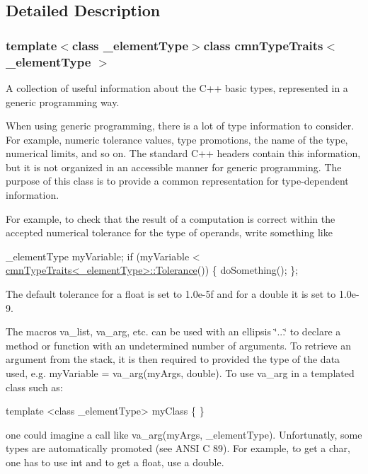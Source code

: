 \subsection{Detailed Description}
\subsubsection*{template$<$class \+\_\+element\+Type$>$class cmn\+Type\+Traits$<$ \+\_\+element\+Type $>$}

A collection of useful information about the C++ basic types, represented in a generic programming way. 

When using generic programming, there is a lot of type information to consider. For example, numeric tolerance values, type promotions, the name of the type, numerical limits, and so on. The standard C++ headers contain this information, but it is not organized in an accessible manner for generic programming. The purpose of this class is to provide a common representation for type-\/dependent information.

For example, to check that the result of a computation is correct within the accepted numerical tolerance for the type of operands, write something like 
\begin{DoxyCode}
\_elementType myVariable;
\textcolor{keywordflow}{if} (myVariable < \hyperlink{classcmn_type_traits}{cmnTypeTraits<\_elementType>::Tolerance}()) \{
    doSomething();
\};
\end{DoxyCode}


The default tolerance for a float is set to 1.\+0e-\/5f and for a double it is set to 1.\+0e-\/9.

The macros va\+\_\+list, va\+\_\+arg, etc. can be used with an ellipsis \char`\"{}...\char`\"{} to declare a method or function with an undetermined number of arguments. To retrieve an argument from the stack, it is then required to provided the type of the data used, e.\+g. my\+Variable = va\+\_\+arg(my\+Args, double). To use va\+\_\+arg in a templated class such as\+:


\begin{DoxyCode}
\textcolor{keyword}{template} <\textcolor{keyword}{class} \_elementType>
myClass \{
\}
\end{DoxyCode}


one could imagine a call like va\+\_\+arg(my\+Args, \+\_\+element\+Type). Unfortunatly, some types are automatically promoted (see A\+N\+S\+I C 89). For example, to get a char, one has to use int and to get a float, use a double.


